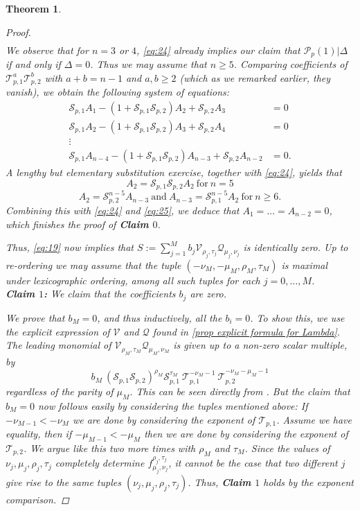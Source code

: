 \documentclass{amsart}%
\theoremstyle{plain}
\newtheorem{thm}{Theorem}[subsection]
\theoremstyle{plain}
\theoremstyle{remark}
\begin{document}
\begin{thm}
\begin{proof}
\begin{align}
        \end{align}
        We observe that for $n=3$ or $4$, \eqref{eq:24} already implies our claim that $\mathcal{P}_p(1)|\Delta$ if and only if $\Delta=0$. Thus we may assume that $n\geq 5$. Comparing coefficients of $\mathcal{T}_{p,1}^a\mathcal{T}_{p,2}^b$ with $a+b=n-1$ and $a,b\geq 2$ (which as we remarked earlier, they vanish), we obtain the following system of equations:
        \begin{align}\label{eq:25}
            \mathcal{S}_{p,1}A_1-(1+\mathcal{S}_{p,1}\mathcal{S}_{p,2})A_2+\mathcal{S}_{p,2}A_3&=0\\
           \nonumber \mathcal{S}_{p,1}A_2-(1+\mathcal{S}_{p,1}\mathcal{S}_{p,2})A_3+\mathcal{S}_{p,2}A_4&=0\\
          \nonumber  \vdots\\
           \nonumber \mathcal{S}_{p,1}A_{n-4}-(1+\mathcal{S}_{p,1}\mathcal{S}_{p,2})A_{n-3}+\mathcal{S}_{p,2}A_{n-2}&=0.
        \end{align}
        A lengthy but elementary substitution exercise, together with \eqref{eq:24}, yields that 
        $$A_2=\mathcal{S}_{p,1}\mathcal{S}_{p,2}A_2\ \text{for}\ n=5$$
        $$A_2=\mathcal{S}_{p,2}^{n-5}A_{n-3}\ \text{and}\ A_{n-3}=\mathcal{S}_{p,1}^{n-5} A_2\ \text{for}\ n\geq 6.$$
        Combining this with \eqref{eq:24} and \eqref{eq:25}, we deduce that $A_1=\dots =A_{n-2}=0$, which finishes the proof of \textbf{Claim $0$}.
        
        Thus, \eqref{eq:19} now implies that $S:=\sum_{j=1}^Mb_j \mathscr{V}_{\rho_j,\tau_j}\mathscr{Q}_{\mu_j,\nu_j}$ is identically zero. Up to re-ordering we may assume that the tuple $(-\nu_M,-\mu_M, \rho_M, \tau_M)$ is maximal under lexicographic ordering, among all such tuples for each $j=0,\dots,M$.\\
        \textbf{Claim $1$:} We claim that the coefficients $b_j$ are zero.
        
        We prove that $b_M=0$, and thus inductively, all the $b_i=0$. To show this, we use the explicit expression 
of $\mathscr{V}$ and $\mathscr{Q}$ found in 
\cref{prop explicit formula for Lambda}. The leading monomial of $\mathscr{V}_{\rho_M,\tau_M}\mathscr{Q}_{\mu_M,\nu_M}$ is given up to a non-zero scalar multiple, by 
$$
b_M\ (\mathcal{S}_{p,1}\mathcal{S}_{p,2})^{\rho_M}\mathcal{S}_{p,1}^{\tau_M}\ \mathcal{T}_{p,1}^{-\nu_M-1}\ \mathcal{T}_{p,2}^{-\nu_M-\mu_M-1}
$$
regardless of the parity of $\mu_M$. This can be seen directly from . But the claim that $b_M=0$ now follows easily by considering the tuples mentioned above: If $-\nu_{M-1}<-\nu_{M}$ we are done by considering the exponent of $\mathcal{T}_{p,1}$. Assume we have equality, then if $-\mu_{M-1}<-\mu_M$ then we are done by considering the exponent of $\mathcal{T}_{p,2}$. We argue like this two more times with $\rho_M$ and $\tau_M$. Since the values of $\nu_j,\mu_j,\rho_j,\tau_j$ completely determine $f_{\mu_j,\nu_j}^{\rho_j,\tau_j}$, it cannot be the case that two different $j$ give rise to the same tuples $(\nu_j,\mu_j,\rho_j,\tau_j)$. Thus, \textbf{Claim $1$} holds by the exponent comparison.


\end{proof}
\end{thm}
\end{document}

